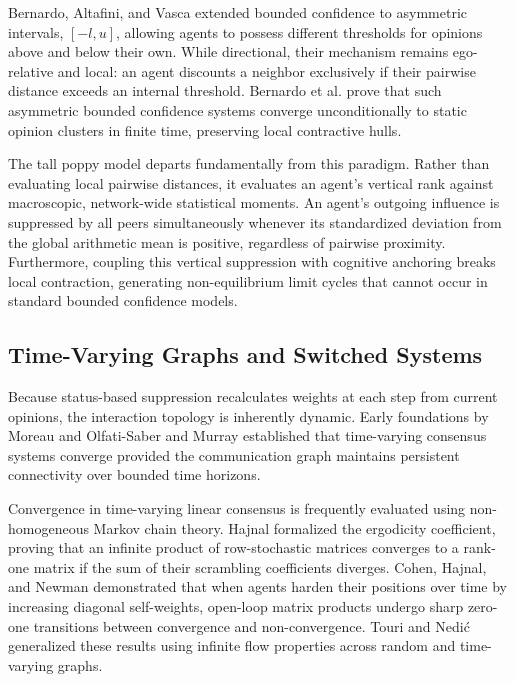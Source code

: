 Bernardo, Altafini, and Vasca extended bounded confidence to asymmetric intervals, $[-l, u]$, allowing agents to possess different thresholds for opinions above and below their own\cite{hajnal1958weak}. While directional, their mechanism remains ego-relative and local: an agent discounts a neighbor exclusively if their pairwise distance exceeds an internal threshold\cite{hajnal1958weak}. Bernardo et al. prove that such asymmetric bounded confidence systems converge unconditionally to static opinion clusters in finite time, preserving local contractive hulls\cite{hajnal1958weak}.

The tall poppy model departs fundamentally from this paradigm\cite{degroot1974reaching,hajnal1958weak}. Rather than evaluating local pairwise distances, it evaluates an agent's vertical rank against macroscopic, network-wide statistical moments\cite{hajnal1958weak}. An agent's outgoing influence is suppressed by all peers simultaneously whenever its standardized deviation from the global arithmetic mean is positive, regardless of pairwise proximity\cite{degroot1974reaching,hajnal1958weak}. Furthermore, coupling this vertical suppression with cognitive anchoring breaks local contraction, generating non-equilibrium limit cycles that cannot occur in standard bounded confidence models\cite{hajnal1958weak}.

\subsection{Time-Varying Graphs and Switched Systems}
Because status-based suppression recalculates weights at each step from current opinions, the interaction topology is inherently dynamic\cite{degroot1974reaching}. Early foundations by Moreau and Olfati-Saber and Murray established that time-varying consensus systems converge provided the communication graph maintains persistent connectivity over bounded time horizons\cite{degroot1974reaching,hajnal1958weak}.

Convergence in time-varying linear consensus is frequently evaluated using non-homogeneous Markov chain theory\cite{degroot1974reaching,hajnal1958weak}. Hajnal formalized the ergodicity coefficient, proving that an infinite product of row-stochastic matrices converges to a rank-one matrix if the sum of their scrambling coefficients diverges\cite{degroot1974reaching,hajnal1958weak}. Cohen, Hajnal, and Newman demonstrated that when agents harden their positions over time by increasing diagonal self-weights, open-loop matrix products undergo sharp zero-one transitions between convergence and non-convergence\cite{degroot1974reaching,hajnal1958weak}. Touri and Nedić generalized these results using infinite flow properties across random and time-varying graphs\cite{degroot1974reaching,hajnal1958weak}.

